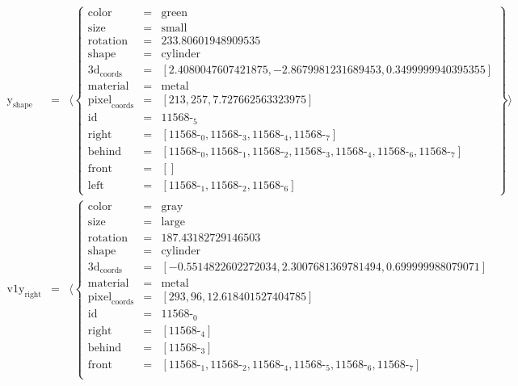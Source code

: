 \documentclass{minimal}
\begin{document}
$$\begin{array}{rcl}
\text{y}_{\text{shape}} &=& \langle \left\{\begin{array}{rcl}
\text{color} &=& \text{green}\\
\text{size} &=& \text{small}\\
\text{rotation} &=& 233.80601948909535\\
\text{shape} &=& \text{cylinder}\\
\text{3d}_{\text{coords}} &=& [ 2.4080047607421875, -2.8679981231689453, 0.3499999940395355]\\
\text{material} &=& \text{metal}\\
\text{pixel}_{\text{coords}} &=& [ 213, 257, 7.727662563323975]\\
\text{id} &=& \text{11568-}_{\text{5}}\\
\text{right} &=& [ \text{11568-}_{\text{0}}, \text{11568-}_{\text{3}}, \text{11568-}_{\text{4}}, \text{11568-}_{\text{7}}]\\
\text{behind} &=& [ \text{11568-}_{\text{0}}, \text{11568-}_{\text{1}}, \text{11568-}_{\text{2}}, \text{11568-}_{\text{3}}, \text{11568-}_{\text{4}}, \text{11568-}_{\text{6}}, \text{11568-}_{\text{7}}]\\
\text{front} &=& [ ]\\
\text{left} &=& [ \text{11568-}_{\text{1}}, \text{11568-}_{\text{2}}, \text{11568-}_{\text{6}}]
\end{array}\right\}\rangle\\
\text{v1y}_{\text{right}} &=& \langle \left\{\begin{array}{rcl}
\text{color} &=& \text{gray}\\
\text{size} &=& \text{large}\\
\text{rotation} &=& 187.43182729146503\\
\text{shape} &=& \text{cylinder}\\
\text{3d}_{\text{coords}} &=& [ -0.5514822602272034, 2.3007681369781494, 0.699999988079071]\\
\text{material} &=& \text{metal}\\
\text{pixel}_{\text{coords}} &=& [ 293, 96, 12.618401527404785]\\
\text{id} &=& \text{11568-}_{\text{0}}\\
\text{right} &=& [ \text{11568-}_{\text{4}}]\\
\text{behind} &=& [ \text{11568-}_{\text{3}}]\\
\text{front} &=& [ \text{11568-}_{\text{1}}, \text{11568-}_{\text{2}}, \text{11568-}_{\text{4}}, \text{11568-}_{\text{5}}, \text{11568-}_{\text{6}}, \text{11568-}_{\text{7}}]\\

\end{array}
\end{array}$$
\end{document}
